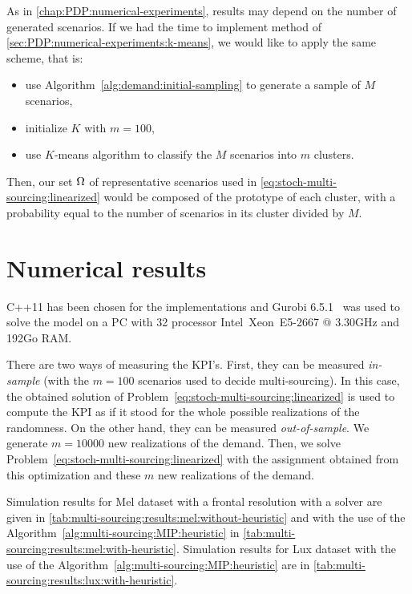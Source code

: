 As in \cref{chap:PDP:numerical-experiments}, results may depend on the number of generated scenarios.
If we had the time to implement method of \cref{sec:PDP:numerical-experiments:k-means}, we would like to apply the same scheme, that is:
\begin{itemize}
  \item use Algorithm~\ref{alg:demand:initial-sampling} to generate a sample of $M$ scenarios,
  \item initialize $K$ with $m=100$,
  \item use $K$-means algorithm to classify the $M$ scenarios into $m$ clusters.
\end{itemize}
Then, our set $\Omega$ of representative scenarios used in \cref{eq:stoch-multi-sourcing:linearized} would be composed of the prototype of each cluster, with a probability equal to the number of scenarios in its cluster divided by $M$.


\section{Numerical results}
\label{sec:multi-sourcing:numerical-experiments:numerical-results}




C++11 has been chosen for the implementations and Gurobi 6.5.1~\citet{gurobi} was used to solve the model on a PC with 32 processor Intel\textregistered\ Xeon\texttrademark\ E5-2667 @ 3.30GHz and 192Go RAM.


There are two ways of measuring the KPI's.
First, they can be measured \emph{in-sample} (\ie with the $m=100$ scenarios used to decide multi-sourcing).
In this case, the obtained solution of Problem~\eqref{eq:stoch-multi-sourcing:linearized} is used to compute the KPI as if it stood for the whole possible realizations of the randomness.
On the other hand, they can be measured \emph{out-of-sample}.
We generate $m=10000$ new realizations of the demand.
Then, we solve Problem~\eqref{eq:stoch-multi-sourcing:linearized} with the assignment obtained from this optimization and these $m$ new realizations of the demand.


Simulation results for Mel dataset with a frontal resolution with a solver are given in \cref{tab:multi-sourcing:results:mel:without-heuristic} and with the use of the Algorithm~\ref{alg:multi-sourcing:MIP:heuristic} in \cref{tab:multi-sourcing:results:mel:with-heuristic}.
Simulation results for Lux dataset with the use of the Algorithm~\ref{alg:multi-sourcing:MIP:heuristic} are in \cref{tab:multi-sourcing:results:lux:with-heuristic}.


